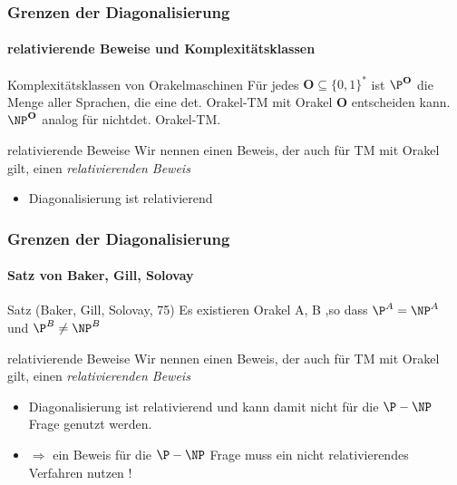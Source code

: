 \begin{frame}
	\frametitle{Grenzen der Diagonalisierung}
	\framesubtitle{relativierende Beweise und Komplexitätsklassen}
	\begin{KITinfoblock}{Komplexitätsklassen von Orakelmaschinen}
		Für jedes $\mathbf{O} \subseteq \{0,1\}^*$ ist ${\P}^{\mathbf{O}}$ die Menge
		aller Sprachen, die eine det. Orakel-TM mit Orakel $\mathbf{O}$ entscheiden
		kann.
		${\NP}^{\mathbf{O}}$ analog für nichtdet. Orakel-TM.
		
	\end{KITinfoblock}
	\bigskip 
	\pause
	\begin{KITinfoblock}{relativierende Beweise}
		Wir nennen einen Beweis, der auch für TM mit Orakel gilt, einen \newline
		\emph{relativierenden Beweis}
	\end{KITinfoblock}
	\begin{itemize}[<+->]
		\item Diagonalisierung ist relativierend
	\end{itemize}
\end{frame}
\begin{frame}
	\frametitle{Grenzen der Diagonalisierung}
	\framesubtitle{Satz von Baker, Gill, Solovay}
	\begin{KITinfoblock}{Satz (Baker, Gill, Solovay, 75)}
		Es existieren Orakel A, B ,so dass ${\P}^A = {\NP}^A$ und ${\P}^B \neq
		{\NP}^B$
	\end{KITinfoblock}
	\bigskip
	\pause
		\begin{KITinfoblock}{relativierende Beweise}
			Wir nennen einen Beweis, der auch für TM mit Orakel gilt, einen \newline
			\emph{relativierenden Beweis}
		\end{KITinfoblock}
		\pause
		\begin{itemize}[<+->]
		\item Diagonalisierung ist relativierend und kann damit nicht f\"ur die $\P
		- \NP$ Frage genutzt werden.
		\item $\Rightarrow$ ein Beweis für die $\P-\NP$ Frage muss ein nicht
		relativierendes Verfahren nutzen !
		\end{itemize}
		
		
	
\end{frame}



